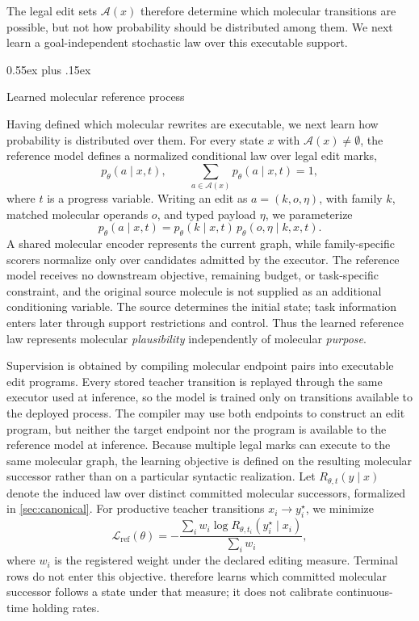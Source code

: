 \documentclass{article}
\makeatletter
\theoremstyle{definition}
\theoremstyle{remark}
\def\subsection{\@startsection{subsection}{2}{\z@}{-1.2ex plus -0.4ex minus -.2ex}%
  {0.55ex plus .15ex}{\normalsize\sc\raggedright}}
\newcommand{\A}{\mathcal{A}}
\makeatother
\begin{document}
The legal edit sets $\A(x)$ therefore determine which molecular transitions are possible, but not how probability should be distributed among them. We next learn a goal-independent stochastic law over this executable support.

\subsection{Learned molecular reference process}
\label{sec:rtheta}

Having defined which molecular rewrites are executable, we next learn how probability is distributed over them. For every state $x$ with $\A(x)\neq\emptyset$, the reference model defines a normalized conditional law over legal edit marks,
\begin{equation}
p_\theta(a\mid x,t),\qquad\sum_{a\in\A(x)}p_\theta(a\mid x,t)=1,
\label{eq:marklaw}
\end{equation}
where $t$ is a progress variable. Writing an edit as $a=(k,o,\eta)$, with family $k$, matched molecular operands $o$, and typed payload $\eta$, we parameterize
\begin{equation}
p_\theta(a\mid x,t)=p_\theta(k\mid x,t)\,p_\theta(o,\eta\mid k,x,t).
\label{eq:hierarchical}
\end{equation}
A shared molecular encoder represents the current graph, while family-specific scorers normalize only over candidates admitted by the executor. The reference model receives no downstream objective, remaining budget, or task-specific constraint, and the original source molecule is not supplied as an additional conditioning variable. The source determines the initial state; task information enters later through support restrictions and control. Thus the learned reference law represents molecular \emph{plausibility} independently of molecular \emph{purpose}.

Supervision is obtained by compiling molecular endpoint pairs into executable edit programs. Every stored teacher transition is replayed through the same executor used at inference, so the model is trained only on transitions available to the deployed process. The compiler may use both endpoints to construct an edit program, but neither the target endpoint nor the program is available to the reference model at inference. Because multiple legal marks can execute to the same molecular graph, the learning objective is defined on the resulting molecular successor rather than on a particular syntactic realization. Let $R_{\theta,t}(y\mid x)$ denote the induced law over distinct committed molecular successors, formalized in \cref{sec:canonical}. For productive teacher transitions $x_i\rightarrow y^{\star}_i$, we minimize
\begin{equation}
\mathcal{L}_{\mathrm{ref}}(\theta)=-\frac{\sum_i w_i\log R_{\theta,t_i}(y^{\star}_i\mid x_i)}{\sum_i w_i},
\label{eq:refloss}
\end{equation}
where $w_i$ is the registered weight under the declared editing measure. Terminal rows do not enter this objective.  therefore learns which committed molecular successor follows a state under that measure; it does not calibrate continuous-time holding rates.
\end{document}
